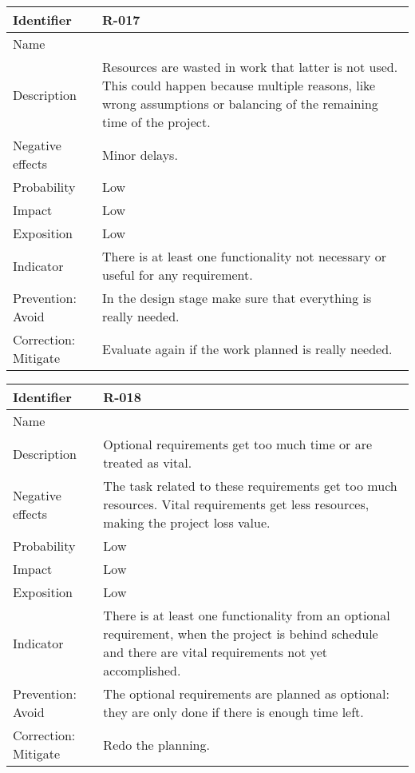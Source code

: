 \begin{table}[H]
	\begin{tabularx}{\textwidth}{|y|z|}
		\hline
		Identifier & \textbf{R-017} \\ \hline
		Name & \Rdiecisiete \\ \hline
		Description &
			Resources are wasted in work that latter is not used. \linej
			This could happen because multiple reasons, like wrong assumptions or balancing of the remaining time of the project.
		\\ \hline
		Negative effects &
			Minor delays.
		\\ \hline
		Probability & Low\\ \hline
		Impact &  Low\\ \hline
		Exposition &  Low\\ \hline
		Indicator & There is at least one functionality not necessary or useful for any requirement.\\ \hline
		Prevention: Avoid &
			In the design stage make sure that everything is really needed.
		\\ \hline
		Correction: Mitigate &
			Evaluate again if the work planned is really needed.
		\\ \hline
	\end{tabularx}
\end{table}

\begin{table}[H]
	\begin{tabularx}{\textwidth}{|y|z|}
		\hline
		Identifier & \textbf{R-018} \\ \hline
		Name & \Rdieciocho \\ \hline
		Description &
			Optional requirements get too much time or are treated as vital.
		\\ \hline
		Negative effects &
			The task related to these requirements get too much resources.\linej
			Vital requirements get less resources, making the project loss value.
		\\ \hline
		Probability & Low\\ \hline
		Impact &  Low\\ \hline
		Exposition &  Low\\ \hline
		Indicator & There is at least one functionality from an optional requirement, when the project is behind schedule and there are vital requirements not yet accomplished.\\ \hline
		Prevention: Avoid &
			The optional requirements are planned as optional: they are only done if there is enough time left.
		\\ \hline
		Correction: Mitigate &
			Redo the planning.
		\\ \hline
	\end{tabularx}
\end{table}

